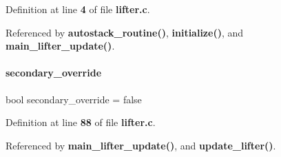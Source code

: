 Definition at line \textbf{ 4} of file \textbf{ lifter.\+c}.



Referenced by \textbf{ autostack\+\_\+routine()}, \textbf{ initialize()}, and \textbf{ main\+\_\+lifter\+\_\+update()}.

\mbox{\label{lifter_8c_ad0dce62ab81a71d1c53831e375cde64c}} 
\paragraph{secondary\+\_\+override}
{\footnotesize\ttfamily bool secondary\+\_\+override = false\hspace{0.3cm}{\ttfamily [static]}}



Definition at line \textbf{ 88} of file \textbf{ lifter.\+c}.



Referenced by \textbf{ main\+\_\+lifter\+\_\+update()}, and \textbf{ update\+\_\+lifter()}.

